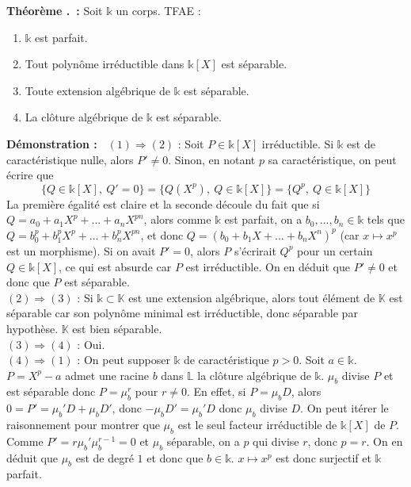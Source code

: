 \documentclass[5pt,a4paper]{article}
\newcounter{thm}[section]
\renewcommand{\thethm}{\thesection.\arabic{thm}}
\newcommand{\thmEnum}[1]{\stepcounter{thm}\noindent\textbf{Théorème \thethm ~:} #1}
\newcommand{\demo}[1]{\textbf{Démonstration :~} #1 \newline}
\begin{document}
\begin{onehalfspacing}
\thmEnum{Soit $\mathds{k}$ un corps. TFAE :
	\begin{enumerate}
	\item $\mathds{k}$ est parfait.
	\item Tout polynôme irréductible dans $\mathds{k}[X]$ est séparable.
	\item Toute extension algébrique de $\mathds{k}$ est séparable.
	\item La clôture algébrique de $\mathds{k}$ est séparable.
	\end{enumerate}
}
\demo{$(1) \Rightarrow (2)$ : Soit $P \in \mathds{k}[X]$ irréductible. Si $\mathds{k}$ est de caractéristique nulle, alors $P' \neq 0$. Sinon, en notant $p$ sa caractéristique, on peut écrire que 
\[ \{Q \in \mathds{k}[X],~Q' = 0\} = \{Q(X^p),~Q \in \mathds{k}[X]\} = \{Q^p,~Q \in \mathds{k}[X]\} \]
La première égalité est claire et la seconde découle du fait que si $Q = a_0 + a_1X^p + ... + a_nX^{pn}$, alors comme $\mathds{k}$ est parfait, on a $b_0, ..., b_n \in \mathds{k}$ tels que $Q = b_0^p + b_1^pX^p + ... + b_n^pX^{pn}$, et donc $Q = (b_0 + b_1X + ... + b_nX^n)^p$ (car $x \mapsto x^p$ est un morphisme). Si on avait $P' = 0$, alors $P$ s'écrirait $Q^p$ pour un certain $Q \in \mathds{k}[X]$, ce qui est absurde car $P$ est irréductible. On en déduit que $P' \neq 0$ et donc que $P$ est séparable. 
\\$(2) \Rightarrow (3)$ : Si $\mathds{k} \subset \mathbb{K}$ est une extension algébrique, alors tout élément de $\mathbb{K}$ est séparable car son polynôme minimal est irréductible, donc séparable par hypothèse. $\mathbb{K}$ est bien séparable. 
\\$(3) \Rightarrow (4)$ : Oui. 
\\$(4) \Rightarrow (1)$ : On peut supposer $\mathds{k}$ de caractéristique $p > 0$. Soit $a \in \mathds{k}$. $P = X^p - a$ admet une racine $b$ dans $\mathbb{L}$ la clôture algébrique de $\mathds{k}$. $\mu_b$ divise $P$ et est séparable donc $P = \mu_b^r$ pour $r \neq 0$. En effet, si $P = \mu_bD$, alors $0 = P' = \mu_b'D + \mu_bD'$, donc $-\mu_bD' = \mu_b'D$ donc $\mu_b$ divise $D$. On peut itérer le raisonnement pour montrer que $\mu_b$ est le seul facteur irréductible de $\mathds{k}[X]$ de $P$. Comme $P' = r\mu_b'\mu_b^{r-1} = 0$ et $\mu_b$ séparable, on a $p$ qui divise $r$, donc $p = r$. On en déduit que $\mu_b$ est de degré $1$ et donc que $b \in \mathds{k}$. $x \mapsto x^p$ est donc surjectif et $\mathds{k}$ parfait.}



\end{onehalfspacing}
\end{document}
